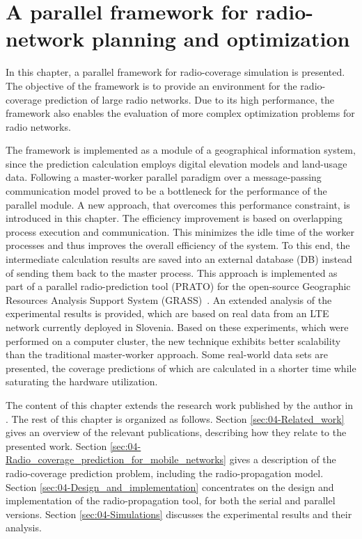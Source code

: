 
\chapter{A parallel framework for radio-network planning and optimization
\label{chap:04-Framework-design-and-implementation}}


In this chapter, a parallel framework for radio-coverage simulation
is presented. The objective of the framework is to provide an environment
for the radio-coverage prediction of large radio networks. Due to
its high performance, the framework also enables the evaluation of
more complex optimization problems for radio networks. 

The framework is implemented as a module of a geographical information
system, since the prediction calculation employs digital elevation
models and land-usage data. Following a master-worker parallel paradigm
over a message-passing communication model proved to be a bottleneck
for the performance of the parallel module. A new approach, that overcomes
this performance constraint, is introduced in this chapter. The efficiency
improvement is based on overlapping process execution and communication.
This minimizes the idle time of the worker processes and thus improves
the overall efficiency of the system. To this end, the intermediate
calculation results are saved into an external database (DB)
instead of sending them back to the master process. This approach
is implemented as part of a parallel radio-prediction tool (PRATO)
for the open-source Geographic Resources Analysis Support System (GRASS)~\cite{Neteler_Open_source_GIS_a_GRASS_GIS_approach}.
An extended analysis of the experimental results is provided, which
are based on real data from an LTE network currently deployed in Slovenia.
Based on these experiments, which were performed on a computer cluster,
the new technique exhibits better scalability than the traditional
master-worker approach. Some real-world data sets are presented, the
coverage predictions of which are calculated in a shorter time while
saturating the hardware utilization.

The content of this chapter extends the research work published by
the author in \cite{Benedicic-A_GRASS_GIS_parallel_module_for_radio_propagation_predictions:2013}.
The rest of this chapter is organized as follows. Section \ref{sec:04-Related_work}
gives an overview of the relevant publications, describing how they
relate to the presented work. Section \ref{sec:04-Radio_coverage_prediction_for_mobile_networks}
gives a description of the radio-coverage prediction problem, including
the radio-propagation model. Section \ref{sec:04-Design_and_implementation}
concentrates on the design and implementation of the radio-propagation
tool, for both the serial and parallel versions. Section \ref{sec:04-Simulations}
discusses the experimental results and their analysis.

